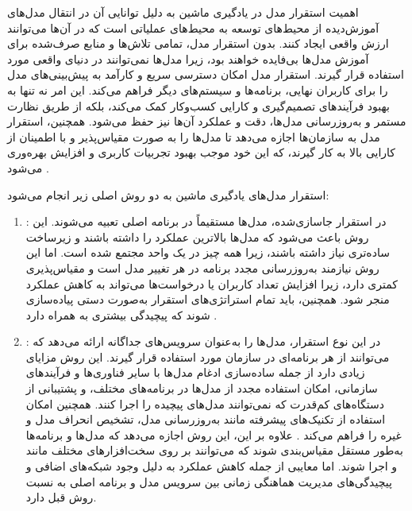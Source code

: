 اهمیت استقرار مدل در یادگیری ماشین به دلیل توانایی آن در انتقال مدل‌های آموزش‌دیده از محیط‌های توسعه به محیط‌های عملیاتی است که در آن‌ها می‌توانند ارزش واقعی ایجاد کنند. بدون استقرار مدل، تمامی تلاش‌ها و منابع صرف‌شده برای آموزش مدل‌ها بی‌فایده خواهند بود، زیرا مدل‌ها نمی‌توانند در دنیای واقعی مورد استفاده قرار گیرند. استقرار مدل امکان دسترسی سریع و کارآمد به پیش‌بینی‌های مدل را برای کاربران نهایی، برنامه‌ها و سیستم‌های دیگر فراهم می‌کند. این امر نه تنها به بهبود فرآیندهای تصمیم‌گیری و کارایی کسب‌وکار کمک می‌کند، بلکه از طریق نظارت مستمر و به‌روزرسانی مدل‌ها، دقت و عملکرد آن‌ها نیز حفظ می‌شود. همچنین، استقرار مدل به سازمان‌ها اجازه می‌دهد تا مدل‌ها را به صورت مقیاس‌پذیر و با اطمینان از کارایی بالا به کار گیرند، که این خود موجب بهبود تجربیات کاربری و افزایش بهره‌وری می‌شود \cite{kubeflowforML}.

استقرار مدل‌های یادگیری ماشین به دو روش اصلی زیر انجام می‌شود: 

\begin{enumerate}
	\item
	:
	در استقرار جاسازی‌شده، مدل‌ها مستقیماً در برنامه اصلی تعبیه می‌شوند. این روش باعث می‌شود که مدل‌ها بالاترین عملکرد را داشته باشند و زیرساخت ساده‌تری نیاز داشته باشند، زیرا همه چیز در یک واحد مجتمع شده است. اما این روش نیازمند به‌روزرسانی مجدد برنامه در هر تغییر مدل است و مقیاس‌پذیری کمتری دارد، زیرا افزایش تعداد کاربران یا درخواست‌ها می‌تواند به کاهش عملکرد منجر شود. همچنین، باید تمام استراتژی‌های استقرار به‌صورت دستی پیاده‌سازی شوند که پیچیدگی بیشتری به همراه دارد \cite{kubeflowforML}.
	\item 
	:
	در این نوع استقرار، مدل‌ها را به‌عنوان سرویس‌های جداگانه ارائه می‌دهد که می‌توانند از هر برنامه‌ای در سازمان مورد استفاده قرار گیرند. این روش مزایای زیادی دارد از جمله ساده‌سازی ادغام مدل‌ها با سایر فناوری‌ها و فرآیندهای سازمانی، امکان استفاده مجدد از مدل‌ها در برنامه‌های مختلف، و پشتیبانی از دستگاه‌های کم‌قدرت که نمی‌توانند مدل‌های پیچیده را اجرا کنند.  همچنین امکان استفاده از تکنیک‌های پیشرفته مانند به‌روزرسانی مدل، تشخیص انحراف مدل و غیره را فراهم می‌کند \cite{kubeflowforML}. علاوه بر این، این روش اجازه می‌دهد که مدل‌ها و برنامه‌ها به‌طور مستقل مقیاس‌بندی شوند که می‌توانند بر روی سخت‌افزارهای مختلف مانند  و  اجرا شوند. اما معایبی از جمله کاهش عملکرد به دلیل وجود شبکه‌های اضافی و پیچیدگی‌های مدیریت هماهنگی زمانی بین سرویس مدل و برنامه اصلی به نسبت روش قبل دارد. 
\end{enumerate}

